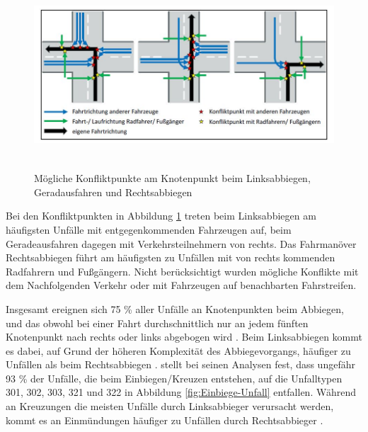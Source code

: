 \begin{savenotes}
	\begin{figure}[H]
		\centering
		\includegraphics[width=15cm,height=7cm]{figures/Konfliktpunkte}
		\caption[Mögliche Konfliktpunkte am Knotenpunkt beim Linksabbiegen, Geradausfahren und Rechtsabbiegen]{Mögliche Konfliktpunkte am Knotenpunkt beim Linksabbiegen, Geradausfahren und Rechtsabbiegen \parencite[S. 41]{Gerstenberger.17.02.2015}}\label{fig:Konfliktpunke am Knotenpunkt}
	\end{figure}
\end{savenotes}

Bei den Konfliktpunkten in Abbildung \ref{fig:Konfliktpunke am Knotenpunkt} treten beim Linksabbiegen am häufigsten Unfälle mit entgegenkommenden Fahrzeugen auf, beim Geradeausfahren dagegen mit Verkehrsteilnehmern von rechts. Das Fahrmanöver Rechtsabbiegen führt am häufigsten zu Unfällen mit von rechts kommenden Radfahrern und Fußgängern. Nicht berücksichtigt wurden mögliche Konflikte mit dem Nachfolgenden Verkehr oder mit Fahrzeugen auf benachbarten Fahrstreifen.

Insgesamt ereignen sich 75 \% aller Unfälle an Knotenpunkten beim Abbiegen, und das obwohl bei einer Fahrt durchschnittlich nur an jedem fünften Knotenpunkt nach rechts oder links abgebogen wird \parencite[S. 101f]{Gerstenberger.17.02.2015}. Beim Linksabbiegen kommt es dabei, auf Grund der höheren Komplexität des Abbiegevorgangs, häufiger zu Unfällen als beim Rechtsabbiegen \parencite[S. 117]{Grundl.2005}. \Textcite[S. 15]{Mages.2008} stellt bei seinen Analysen fest, dass ungefähr 93 \% der Unfälle, die beim Einbiegen/Kreuzen entstehen, auf die Unfalltypen 301, 302, 303, 321 und 322 in Abbildung \ref{fig:Einbiege-Unfall} entfallen. Während an Kreuzungen die meisten Unfälle durch Linksabbieger verursacht werden, kommt es an Einmündungen häufiger zu Unfällen durch Rechtsabbieger \parencite[S. 102-103] {Gerstenberger.17.02.2015}.

